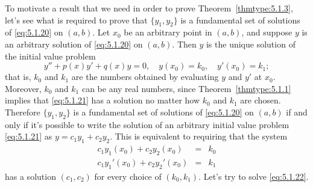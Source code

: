 \documentclass{ximera}
\begin{document}
To motivate a result that we need in order to prove
Theorem~\ref{thmtype:5.1.3},
 let's see what is required to prove that  $\{y_1,y_2\}$
is a  fundamental set of solutions of \eqref{eq:5.1.20} on  $(a,b)$.
Let $x_0$ be an arbitrary point in  $(a,b)$, and
suppose  $y$ is an arbitrary  solution of
\eqref{eq:5.1.20} on  $(a,b)$.  Then $y$ is the unique solution of the
initial value problem
\begin{equation}\label{eq:5.1.21}
y''+p(x)y'+q(x)y=0,\quad y(x_0)=k_0,\quad y'(x_0)=k_1;
\end{equation}
that is, $k_0$ and $k_1$ are the numbers obtained by evaluating $y$
and $y'$ at $x_0$. Moreover, $k_0$ and $k_1$ can be any real numbers,
since Theorem~\ref{thmtype:5.1.1} implies that \eqref{eq:5.1.21} has a
solution no matter how $k_0$ and $k_1$ are chosen.
Therefore  $\{y_1,y_2\}$ is a fundamental set of solutions of
\eqref{eq:5.1.20} on $(a,b)$ if and only if it's possible to write the
solution of an arbitrary initial value problem \eqref{eq:5.1.21}
as $y=c_1y_1+c_2y_2$. This is equivalent to requiring that the
system
\begin{equation}\label{eq:5.1.22}
\begin{array}{rcl}
c_1y_1(x_0)+c_2y_2(x_0)&=&k_0\\
c_1y_1'(x_0)+c_2y_2'(x_0)&=&k_1
\end{array}
\end{equation}
has  a solution $(c_1,c_2)$ for every choice of $(k_0,k_1)$.
Let's try to solve \eqref{eq:5.1.22}.
 
\end{document}
